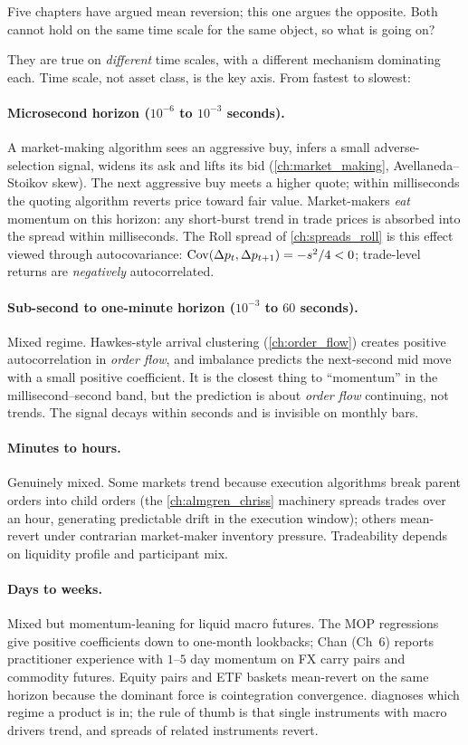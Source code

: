 Five chapters have argued mean reversion; this one argues the
opposite. Both cannot hold on the same time scale for the same
object, so what is going on?

They are true on \emph{different} time scales, with a different
mechanism dominating each. Time scale, not asset class, is the
key axis. From fastest to slowest:

\paragraph{Microsecond horizon ($10^{-6}$ to $10^{-3}$ seconds).}
A market-making algorithm sees an aggressive buy, infers a small
adverse-selection signal, widens its ask and lifts its bid
(\cref{ch:market_making}, Avellaneda--Stoikov skew). The next
aggressive buy meets a higher quote; within milliseconds the
quoting algorithm reverts price toward fair value. Market-makers
\emph{eat} momentum on this horizon: any short-burst trend in
trade prices is absorbed into the spread within milliseconds. The
Roll spread of \cref{ch:spreads_roll} is this effect viewed
through autocovariance: $\operatorname{Cov}(\Delta p_t, \Delta p_{t+1}) = -s^2/4
< 0$; trade-level returns are \emph{negatively} autocorrelated.

\paragraph{Sub-second to one-minute horizon ($10^{-3}$ to $60$
seconds).} Mixed regime. Hawkes-style arrival clustering
(\cref{ch:order_flow}) creates positive autocorrelation in
\emph{order flow}, and imbalance predicts the next-second mid move
with a small positive coefficient. It is the closest thing to
``momentum'' in the millisecond--second band, but the prediction
is about \emph{order flow} continuing, not trends. The signal
decays within seconds and is invisible on monthly bars.

\paragraph{Minutes to hours.} Genuinely mixed. Some markets trend
because execution algorithms break parent orders into child orders
(the \cref{ch:almgren_chriss} machinery spreads trades over an
hour, generating predictable drift in the execution window);
others mean-revert under contrarian market-maker inventory
pressure. Tradeability depends on liquidity profile and
participant mix.

\paragraph{Days to weeks.} Mixed but momentum-leaning for liquid
macro futures. The MOP regressions give positive coefficients down
to one-month lookbacks; Chan \citeChan{} (Ch~$6$) reports
practitioner experience with $1$--$5$ day momentum on FX carry
pairs and commodity futures. Equity pairs and ETF baskets
mean-revert on the same horizon because the dominant force is
cointegration convergence.  diagnoses
which regime a product is in; the rule of thumb is that single
instruments with macro drivers trend, and spreads of related
instruments revert.

